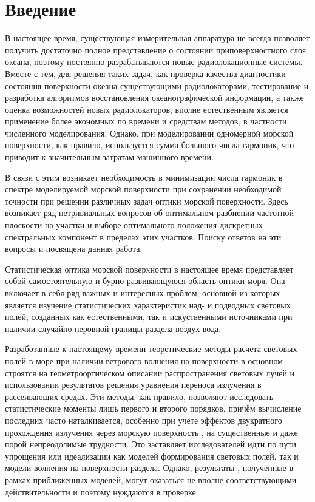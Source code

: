 \section{Введение}
В настоящее время, существующая измерительная аппаратура не всегда позволяет получить достаточно полное представление о состоянии приповерхностного  слоя океана, поэтому постоянно разрабатываются новые радиолокационные системы. 
Вместе с тем, для решения таких задач, как проверка качества диагностики состояния поверхности океана существующими радиолокаторами, тестирование и разработка алгоритмов восстановления океанографической информации, а также оценка возможностей новых радиолокаторов, вполне естественным является применение более экономных по времени и средствам методов, в частности численного моделирования.  Однако, при моделировании одномерной морской поверхности, как правило, используется сумма большого числа гармоник, что приводит к значительным затратам машинного времени.

В связи с этим возникает необходимость в минимизации числа гармоник в спектре моделируемой морской поверхности при сохранении необходимой точности при решении различных задач оптики морской поверхности. Здесь возникает ряд нетривиальных вопросов об оптимальном разбиении частотной плоскости на участки и выборе оптимального положения дискретных спектральных компонент в пределах этих участков. Поиску ответов на эти вопросы и посвящена данная работа.


	Статистическая оптика морской поверхности в настоящее время представляет собой самостоятельную и бурно развивающуюся область оптики моря. Она включает  в себя ряд важных и интересных проблем, основной из которых является изучение статистических характеристик над- и подводных световых полей, созданных как естественными, так и искуственными источниками при наличии случайно-неровной границы раздела воздух-вода. 

	Разработанные к настоящему времени теоретические методы расчета световых полей в море при наличии ветрового волнения на поверхности в основном строятся на геометроортическом описании распространения световых лучей и использовании результатов решения уравнения переноса излучения в рассеивающих средах. Эти методы, как правило, позволяют исследовать статистические моменты лишь первого и второго порядков, причём вычисление последних часто наталкивается, особенно при учёте эффектов двукратного прохождения излучения через морскую поверхность , на существенные и даже порой непреодолимые трудности. Это заставляет исследователей идти по пути упрощения или идеализации как моделей формирования световых полей, так и модели волнения на поверхности раздела. Однако, результаты , полученные в рамках приближенных моделей, могут оказаться не вполне соответствующими действительности и поэтому нуждаются в проверке.



